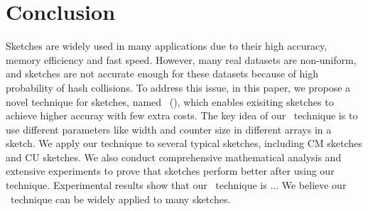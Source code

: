 \presec
\section{Conclusion} \postsec

Sketches are widely used in many applications due to their high accuracy, memory efficiency and fast speed.
However, many real datasets are non-uniform, and sketches are not accurate enough for these datasets because of high probability of hash collisions.
To address this issue, in this paper, we propose a novel technique for sketches, named \fname~(\aname), which enables exisiting sketches to achieve higher accuray with few extra costs.
The key idea of our \aname~technique is to use different parameters like width and counter size in different arrays in a sketch.
We apply our technique to several typical sketches, including CM sketches and CU sketches.
We also conduct comprehensive mathematical analysis and extensive experiments to prove that sketches perform better after using our technique.
Experimental results show that our \aname~technique is ...
We believe our \aname~technique can be widely applied to many sketches.